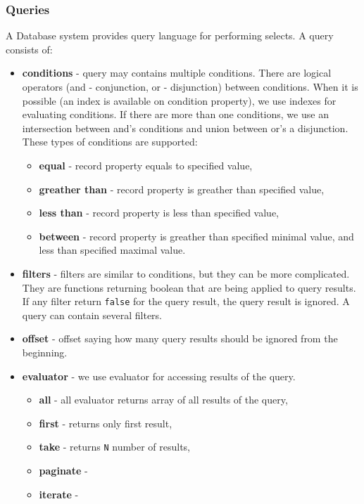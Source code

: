 \subsubsection{Queries} 
A Database system provides query language for performing selects. A query consists of:
\begin{itemize}
    \item \textbf{conditions} - query may contains multiple conditions. There are logical operators (and - conjunction, or - disjunction) between conditions. When it is possible (an index is available on condition property), we use indexes for evaluating conditions. If there are more than one conditions, we use an intersection between and's conditions and union between or's a disjunction. These types of conditions are supported:
    \begin{itemize}
        \item \textbf{equal} - record property equals to specified value,
        \item \textbf{greather than} - record property is greather than specified value,
        \item \textbf{less than} - record property is less than specified value,
        \item \textbf{between} - record property is greather than specified minimal value, and less than specified maximal value.
    \end{itemize} 
    \item \textbf{filters} - filters are similar to conditions, but they can be more complicated. They are functions returning boolean that are being applied to query results. If any filter return \texttt{false} for the query result, the query result is ignored. A query can contain several filters.
    \item \textbf{offset} - offset saying how many query results should be ignored from the beginning.
    \item \textbf{evaluator} - we use evaluator for accessing results of the query.
    \begin{itemize}
        \item \textbf{all} - all evaluator returns array of all results of the query,
        \item \textbf{first} - returns only first result,
        \item \textbf{take} - returns \texttt{N} number of results,
        \item \textbf{paginate} - 
        \item \textbf{iterate} -
    \end{itemize}
\end{itemize}  

